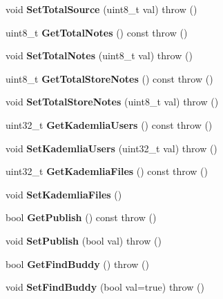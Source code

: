 \begin{DoxyCompactItemize}
\item 
void {\bfseries SetTotalSource} (uint8\_\-t val)  throw ()\label{classKademlia_1_1CPrefs_a674fd87fc5467fee3365a77d3fa02bb9}

\item 
uint8\_\-t {\bfseries GetTotalNotes} () const   throw ()\label{classKademlia_1_1CPrefs_a408980dd78fbba3c8eb64f84d0f13f46}

\item 
void {\bfseries SetTotalNotes} (uint8\_\-t val)  throw ()\label{classKademlia_1_1CPrefs_a88c9ea1c4cad341cfa3db5c73df0f856}

\item 
uint8\_\-t {\bfseries GetTotalStoreNotes} () const   throw ()\label{classKademlia_1_1CPrefs_aa8ee17e641aa05b161ce94d0cebdd2ab}

\item 
void {\bfseries SetTotalStoreNotes} (uint8\_\-t val)  throw ()\label{classKademlia_1_1CPrefs_a1060527449a63ed8e46e4cbf09862d79}

\item 
uint32\_\-t {\bfseries GetKademliaUsers} () const   throw ()\label{classKademlia_1_1CPrefs_a899ef877304eba36429dc5819c14ef2c}

\item 
void {\bfseries SetKademliaUsers} (uint32\_\-t val)  throw ()\label{classKademlia_1_1CPrefs_aced61b1351e5a8babd92f801f3f8fb06}

\item 
uint32\_\-t {\bfseries GetKademliaFiles} () const   throw ()\label{classKademlia_1_1CPrefs_a41afa91c673939e6962aa548ff66305c}

\item 
void {\bfseries SetKademliaFiles} ()\label{classKademlia_1_1CPrefs_a90ba9508b0bd12d342cbf224eca8adb4}

\item 
bool {\bfseries GetPublish} () const   throw ()\label{classKademlia_1_1CPrefs_a5c914179d5880c23ec57f7263fd5da7b}

\item 
void {\bfseries SetPublish} (bool val)  throw ()\label{classKademlia_1_1CPrefs_a9a9941214c6abba07f2d9dd18b2faff1}

\item 
bool {\bfseries GetFindBuddy} ()  throw ()\label{classKademlia_1_1CPrefs_a4bf1c4142ee2a77dfe9ea02c6cb3ac32}

\item 
void {\bfseries SetFindBuddy} (bool val=true)  throw ()\label{classKademlia_1_1CPrefs_a6469ebbdc56126360b3a9d8b6c02ae1f}


\end{DoxyCompactItemize}
